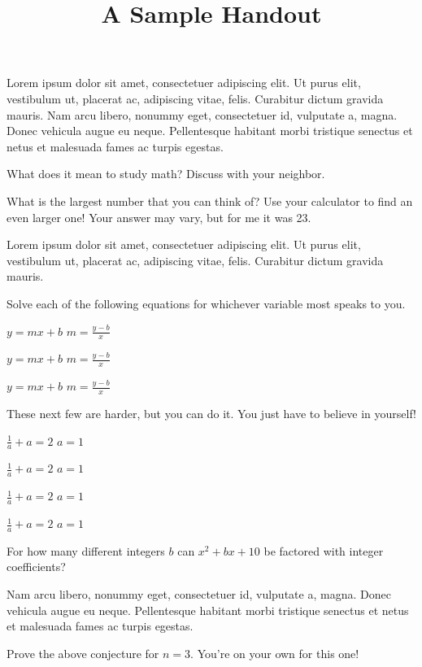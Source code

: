 \documentclass[12pt,twoside,parskip]{handout}
\title{A Sample Handout}
\begin{document}
Lorem ipsum dolor sit amet, consectetuer adipiscing elit. Ut purus elit, vestibulum ut, placerat ac, adipiscing vitae, felis. Curabitur dictum gravida mauris. Nam arcu libero, nonummy eget, consectetuer id, vulputate a, magna. Donec vehicula augue eu neque. Pellentesque habitant morbi tristique senectus et netus et malesuada fames ac turpis egestas.
\begin{prob}
	What does it mean to study math?
	Discuss with your neighbor.
\end{prob}
\begin{prob}[calculator]
	What is the largest number that you can think of?
	Use your calculator to find an even larger one!
	\solution
	Your answer may vary, but for me it was 23.
\end{prob}
\begin{prob}[space=2]
	Lorem ipsum dolor sit amet, consectetuer adipiscing elit. Ut purus elit, vestibulum ut, placerat ac, adipiscing vitae, felis.
	\solution
	Curabitur dictum gravida mauris.
\end{prob}
\newpage
\begin{prob}[columns=3]
	Solve each of the following equations for whichever variable most speaks to you.
	
	\begin{prob}
		$y=mx+b$
		\solution
		$m=\frac{y-b}{x}$
	\end{prob}
	\begin{prob}
		$y=mx+b$
		\solution
		$m=\frac{y-b}{x}$
	\end{prob}
	\begin{prob}
		$y=mx+b$
		\solution
		$m=\frac{y-b}{x}$
	\end{prob}
	These next few are harder, but you can do it.
	You just have to believe in yourself!
	\ProbsInColumns{2}
	
	\begin{prob}
		$\frac{1}{a}+a=2$
		\solution
		$a=1$
	\end{prob}
	\begin{prob}
		$\frac{1}{a}+a=2$
		\solution
		$a=1$
	\end{prob}
	\begin{prob}
		$\frac{1}{a}+a=2$
		\solution
		$a=1$
	\end{prob}
	\begin{prob}
		$\frac{1}{a}+a=2$
		\solution
		$a=1$
	\end{prob}
\end{prob}
\newpage
\begin{prob}
	For how many different integers $b$ can $x^2+bx+10$ be factored with integer coefficients?
	\solution
	4
\end{prob}

\begin{conjecture*}
	Nam arcu libero, nonummy eget, consectetuer id, vulputate a, magna. Donec vehicula augue eu neque. Pellentesque habitant morbi tristique senectus et netus et malesuada fames ac turpis egestas.
\end{conjecture*}
\begin{prob}[space=3, exciting]
	Prove the above conjecture for $n=3$.
	\solution
	You're on your own for this one!
\end{prob}
\end{document}

